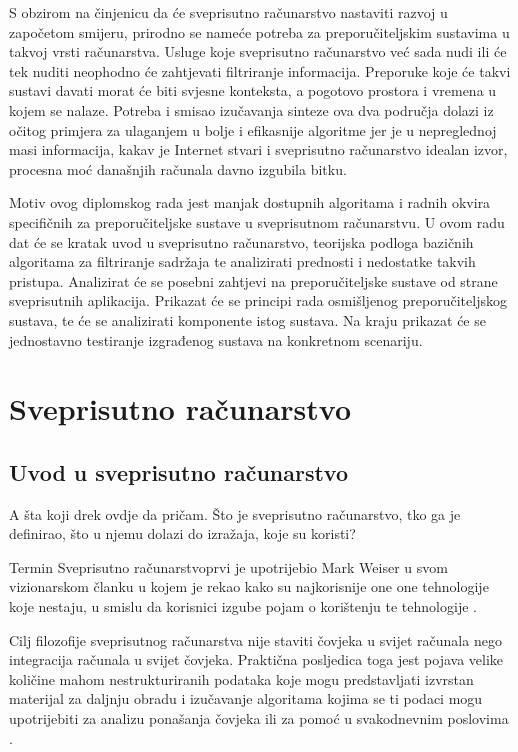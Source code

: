 \documentclass[times, utf8, diplomski, numeric]{fer}
\begin{document}
S obzirom na činjenicu da će sveprisutno računarstvo nastaviti razvoj u
započetom smijeru, prirodno se nameće potreba za preporučiteljskim sustavima u
takvoj vrsti računarstva. Usluge koje sveprisutno računarstvo već sada nudi ili
će tek nuditi neophodno će zahtjevati filtriranje informacija. Preporuke koje će
takvi sustavi davati morat će biti svjesne konteksta, a pogotovo prostora i
vremena u kojem se nalaze. Potreba i smisao izučavanja sinteze ova dva područja
dolazi iz očitog primjera za ulaganjem u bolje i efikasnije algoritme jer je u
nepreglednoj masi informacija, kakav je Internet stvari i sveprisutno
računarstvo idealan izvor, procesna moć današnjih računala davno izgubila
bitku.

Motiv ovog diplomskog rada jest manjak dostupnih algoritama i radnih okvira
specifičnih za preporučiteljske sustave u sveprisutnom računarstvu. U ovom radu
dat će se kratak uvod u sveprisutno računarstvo, teorijska podloga bazičnih
algoritama za filtriranje sadržaja te analizirati prednosti i nedostatke takvih
pristupa. Analizirat će se posebni zahtjevi na preporučiteljske sustave
od strane sveprisutnih aplikacija. Prikazat će se principi rada osmišljenog
preporučiteljskog sustava, te će se analizirati komponente istog sustava. Na
kraju prikazat će se jednostavno testiranje izgrađenog sustava na konkretnom
scenariju.

\chapter{Sveprisutno računarstvo}
\section{Uvod u sveprisutno računarstvo}
A šta koji drek ovdje da pričam. Što je sveprisutno računarstvo, tko ga je
definirao, što u njemu dolazi do izražaja, koje su koristi?

Termin \glqq Sveprisutno računarstvo\grqq prvi je upotrijebio Mark Weiser u
svom vizionarskom članku u kojem je rekao kako su najkorisnije
one one tehnologije koje nestaju, u smislu da korisnici izgube pojam o
korištenju te tehnologije \cite{computer21}. 

Cilj filozofije sveprisutnog računarstva nije staviti čovjeka u svijet računala
nego integracija računala u svijet čovjeka. Praktična posljedica toga jest
pojava velike količine mahom nestrukturiranih podataka koje mogu predstavljati
izvrstan materijal za daljnju obradu i izučavanje algoritama kojima se ti podaci
mogu upotrijebiti za analizu ponašanja čovjeka ili za pomoć u svakodnevnim
poslovima \cite{VukoticTankovic}.
\end{document}

